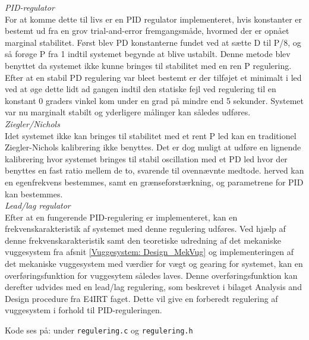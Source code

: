 \textit{PID-regulator}\\
For at komme dette til livs er en PID regulator implementeret, hvis konstanter er bestemt ud fra en grov trial-and-error fremgangsmåde, hvormed der er opnået marginal stabilitet. Først blev PD konstanterne fundet ved at sætte D til P/8, og så forøge P fra 1 indtil systemet begynde at blive ustabilt. Denne metode blev benyttet da systemet ikke kunne bringes til stabilitet med en ren P regulering. Efter at en stabil PD regulering var bleet bestemt er der tilføjet et minimalt i led ved at øge dette lidt ad gangen indtil den statiske fejl ved regulering til en konstant 0 graders vinkel kom under en grad på mindre end 5 sekunder. Systemet var nu marginalt stabilt og yderligere målinger kan således udføres. \\

\textit{Ziegler/Nichols}\\
Idet systemet ikke kan bringes til stabilitet med et rent P led kan en traditionel Ziegler-Nichols kalibrering ikke benyttes. Det er dog muligt at udføre en lignende kalibrering hvor systemet bringes til stabil oscillation med et PD led hvor der benyttes en fast ratio mellem de to, svarende til ovennævnte medtode. herved kan en egenfrekvens bestemmes, samt en grænseforstærkning, og parametrene for PID kan bestemmes.\\

\textit{Lead/lag regulator}\\
Efter at en fungerende PID-regulering er implementeret, kan en frekvenskarakteristik af systemet med denne regulering udføres. Ved hjælp af denne frekvenskarakteristik samt den teoretiske udredning af det mekaniske vuggesystem fra afsnit \vref{Vuggesystem: Design_MekVug} og implementeringen af det mekaniske vuggesystem med værdier for vægt og gearing for systemet, kan en overføringsfunktion for vuggesytem således laves. Denne overføringsfunktion kan derefter udvides med en lead/lag regulering, som beskrevet i bilaget Analysis and Design procedure \citep{IRT} fra E4IRT faget. Dette vil give en forberedt regulering af vuggesystem i forhold til PID-reguleringen.

Kode ses på: \citep{cd} under \verb+regulering.c+ og \verb+regulering.h+\\

\newpage